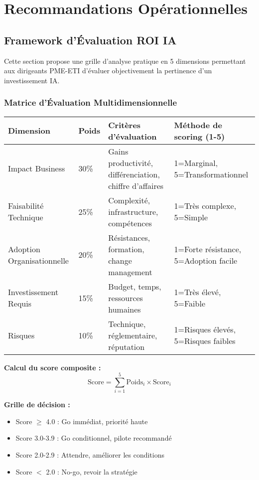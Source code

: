 \chapter{Recommandations Opérationnelles}
\label{app:recommandations}

\section{Framework d'Évaluation ROI IA}

Cette section propose une grille d'analyse pratique en 5 dimensions permettant aux dirigeants PME-ETI d'évaluer objectivement la pertinence d'un investissement IA.

\subsection{Matrice d'Évaluation Multidimensionnelle}

\begin{longtable}{@{}p{3cm}p{2cm}p{4cm}p{5cm}@{}}
\toprule
\textbf{Dimension} & \textbf{Poids} & \textbf{Critères d'évaluation} & \textbf{Méthode de scoring (1-5)} \\
\midrule
Impact Business & 30\% & Gains productivité, différenciation, chiffre d'affaires & 1=Marginal, 5=Transformationnel \\
Faisabilité Technique & 25\% & Complexité, infrastructure, compétences & 1=Très complexe, 5=Simple \\
Adoption Organisationnelle & 20\% & Résistances, formation, change management & 1=Forte résistance, 5=Adoption facile \\
Investissement Requis & 15\% & Budget, temps, ressources humaines & 1=Très élevé, 5=Faible \\
Risques & 10\% & Technique, réglementaire, réputation & 1=Risques élevés, 5=Risques faibles \\
\bottomrule
\end{longtable}

\textbf{Calcul du score composite :}
\[
\text{Score} = \sum_{i=1}^{5} \text{Poids}_i \times \text{Score}_i
\]

\textbf{Grille de décision :}
\begin{itemize}
    \item Score $\geq$ 4.0 : Go immédiat, priorité haute
    \item Score 3.0-3.9 : Go conditionnel, pilote recommandé
    \item Score 2.0-2.9 : Attendre, améliorer les conditions
    \item Score $<$ 2.0 : No-go, revoir la stratégie
\end{itemize}

